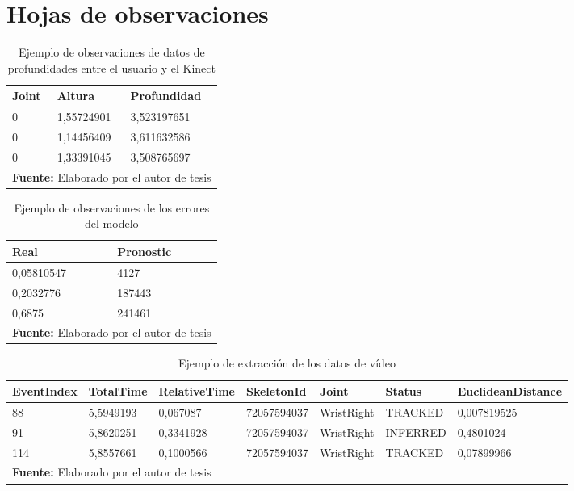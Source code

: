 \section{Hojas de observaciones}
\begin{table}[H]
\begin{center}
\caption{Ejemplo de observaciones de datos de profundidades entre el usuario y el Kinect}
\label{tab:obsDepth}
\begin{tabular}{|l|l|l|}
\hline
Joint & Altura & Profundidad \\ \hline
0 & 1,55724901 & 3,523197651 \\ \hline
0 & 1,14456409 & 3,611632586 \\ \hline
0 & 1,33391045 & 3,508765697 \\ \hline
\multicolumn{3}{l}{\textbf{Fuente:} Elaborado por el autor de tesis}
\end{tabular}
\end{center}
\end{table}

\begin{table}[H]
\begin{center}
\caption{Ejemplo de observaciones de los errores del modelo}
\label{tab:obsErrores}
\begin{tabular}{|l|l|}
\hline
Real & Pronostic \\ \hline
0,05810547 & 4127 \\ \hline
0,2032776 & 187443 \\ \hline
0,6875 & 241461 \\ \hline
\multicolumn{2}{l}{\textbf{Fuente:} Elaborado por el autor de tesis}
\end{tabular}
\end{center}
\end{table}

\begin{table}[H]
\begin{center}
\caption{Ejemplo de extracci\'on de los datos de v\'ideo}
\label{tab:obsVideoData}
\begin{tabular}{|l|l|l|l|l|l|l|}
\hline
EventIndex & TotalTime & RelativeTime  & SkeletonId & Joint & Status & EuclideanDistance \\ \hline
88 & 5,5949193 & 0,067087 & 72057594037 & WristRight & TRACKED & 0,007819525\\ \hline
91 & 5,8620251 & 0,3341928 & 72057594037 & WristRight & INFERRED & 0,4801024\\ \hline
114 & 5,8557661 & 0,1000566 & 72057594037 & WristRight & TRACKED & 0,07899966\\ \hline
\multicolumn{7}{l}{\textbf{Fuente:} Elaborado por el autor de tesis}
\end{tabular}
\end{center}
\end{table}

